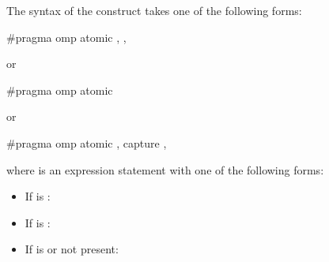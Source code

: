 \begin{ccppspecific}
The syntax of the  construct takes one of the following forms:

\begin{boxedcode}[fontsize=\small]
\#pragma omp atomic \plc{[memory-order-clause[},\plc{]]}  \plc{[[},\plc{]memory-order-clause]} 
\end{boxedcode}


or

\begin{boxedcode}
\#pragma omp atomic  
\end{boxedcode}

or

\begin{boxedcode}[fontsize=\small]
\#pragma omp atomic \plc{[memory-order-clause[},\plc{]]} capture \plc{[[},\plc{]memory-order-clause]} 
\end{boxedcode}

where  is an expression statement with one of the following forms:

\begin{itemize}
\item If  is :\\

\item If  is :\\

\item If  is  or not present:\\
\\
\\
\\
\\
\\
\\


\end{itemize}
\end{ccppspecific}
